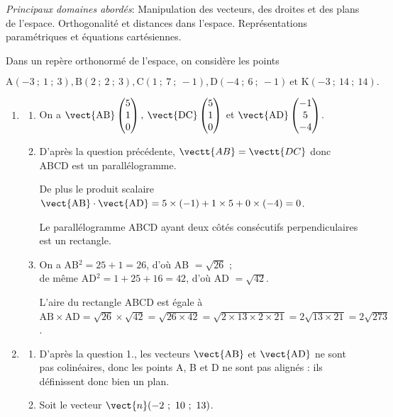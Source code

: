 
\medskip

\emph{Principaux domaines abordés}: Manipulation des vecteurs, des droites et des plans de l'espace. Orthogonalité et distances dans l'espace.
Représentations paramétriques et équations cartésiennes.

\bigskip

Dans un repère orthonormé \Oijk{} de l'espace,
on considère les points 

\[\text{A}(-3~;~1~;~3), \text{B}(2~;~2~;~3), \text{C}(1~;~7~;~-1), \text{D}(-4~;~6~;~-1)\: \text{et 
K}(-3~;~14~;~14).\]


\begin{enumerate}
\item 
	\begin{enumerate}
		\item %
On a $\vect{\text{AB}}\begin{pmatrix}5\\1\\0\end{pmatrix}, \: \vect{\text{DC}}\begin{pmatrix}5\\1\\0\end{pmatrix}$ et $\vect{\text{AD}}\begin{pmatrix}-1\\5\\-4\end{pmatrix}$.
		\item%
D'après la question précédente, $\vectt{AB}=\vectt{DC}$ donc ABCD est un parallélogramme.

De plus le produit scalaire $\vect{\text{AB}} \cdot \vect{\text{AD}} = 5\times(-1) + 1\times 5 + 0\times(-4) = 0$.

Le parallélogramme ABCD ayant deux côtés consécutifs perpendiculaires est un rectangle.

		\item %
On a AB$^2 = 25 + 1 = 26$, d'où AB $= \sqrt{26}$ ; \\
de même AD$^2 =  1  + 25 + 16= 42$, d'où AD $= \sqrt{42}$.

L'aire du rectangle ABCD est égale à \\
$\text{AB} \times \text{AD} = \sqrt{26 }\times\sqrt{42} = \sqrt{26 \times 42} = \sqrt{2 \times 13 \times 2 \times 21} = 2\sqrt{13 \times 21} = 2\sqrt{273}$.
	\end{enumerate}
\item 
	\begin{enumerate}
		\item %
D'après la question 1., les vecteurs $\vect{\text{AB}}$ et $\vect{\text{AD}}$ ne sont pas colinéaires, donc les points A, B et D ne sont pas alignés : ils définissent donc bien un plan.
		\item Soit le vecteur $\vect{n}(-2~;~10~;~13)$.%
		

\end{enumerate}
\end{enumerate}
